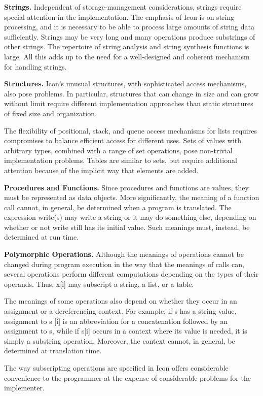 \textbf{Strings.} Independent of storage-management considerations,
strings require special attention in the implementation. The emphasis
of Icon is on string processing, and it is necessary to be able to
process large amounts of string data sufficiently. Strings may be very
long and many operations produce substrings of other strings. The
repertoire of string analysis and string synthesis functions is
large. All this adds up to the need for a well-designed and coherent
mechanism for handling strings.


\textbf{Structures.} Icon's unusual structures, with sophisticated
access mechanisms, also pose problems. In particular, structures that
can change in size and can grow without limit require different
implementation approaches than static structures of fixed size and
organization.


The flexibility of positional, stack, and queue access mechanisms for
lists requires compromises to balance efficient access for different
uses. Sets of values with arbitrary types, combined with a range of
set operations, pose non-trivial implementation problems. Tables are
similar to sets, but require additional attention because of the
implicit way that elements are added.


\textbf{Procedures and Functions.} Since procedures and functions are
values, they must be represented as data objects.  More significantly,
the meaning of a function call cannot, in general, be determined when
a program is translated. The expression write(s) may write a string or
it may do something else, depending on whether or not write still has
its initial value. Such meanings must, instead, be determined at run
time.


\textbf{Polymorphic Operations.} Although the meanings of operations
cannot be changed during program execution in the way that the
meanings of calls can, several operations perform different
computations depending on the types of their operands. Thus, x[i] may
subscript a string, a list, or a table.

The meanings of some operations also depend on whether they occur in
an assignment or a dereferencing context. For example, if s has a
string value, assignment to s [i] is an abbreviation for a
concatenation followed by an assignment to s, while if s[i] occurs in
a context where its value is needed, it is simply a substring
operation. Moreover, the context cannot, in general, be determined at
translation time.

The way subscripting operations are specified in Icon offers
considerable convenience to the programmer at the expense of
considerable problems for the implementer.


